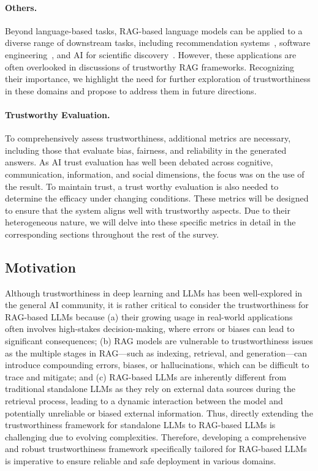 \paragraph{Others.}
Beyond language-based tasks, RAG-based language models can be applied to a diverse range of downstream tasks, including recommendation systems~\cite{li2023gpt4recgenerativeframeworkpersonalized}, software engineering~\cite{fan2023largelanguagemodelssoftware}, and AI for scientific discovery~\cite{ai4science2023impactlargelanguagemodels}. However, these applications are often overlooked in discussions of trustworthy RAG frameworks. Recognizing their importance, we highlight the need for further exploration of trustworthiness in these domains and propose to address them in future directions.

\paragraph{Trustworthy Evaluation.} To comprehensively assess trustworthiness, additional metrics are necessary, including those that evaluate bias, fairness, and reliability in the generated answers. As AI trust evaluation has well been debated across cognitive, communication, information, and social dimensions, the focus was on the use of the result. To maintain trust, a trust worthy evaluation is also needed to determine the efficacy under changing conditions. These metrics will be designed to ensure that the system aligns well with trustworthy aspects. Due to their heterogeneous nature, we will delve into these specific metrics in detail in the corresponding sections throughout the rest of the survey.


\subsection{Motivation}

Although trustworthiness in deep learning and LLMs has been well-explored in the general AI community, it is rather critical to consider the trustworthiness for RAG-based LLMs because (a) their growing usage in real-world applications often involves high-stakes decision-making, where errors or biases can lead to significant consequences; (b) RAG models are vulnerable to trustworthiness issues as the multiple stages in RAG—such as indexing, retrieval, and generation—can introduce compounding errors, biases, or hallucinations, which can be difficult to trace and mitigate; and (c) RAG-based LLMs are inherently different from traditional standalone LLMs as they rely on external data sources during the retrieval process, leading to a dynamic interaction between the model and potentially unreliable or biased external information. Thus, directly extending the trustworthiness framework for standalone LLMs to RAG-based LLMs is challenging due to evolving complexities. Therefore, developing a comprehensive and robust trustworthiness framework specifically tailored for RAG-based LLMs is imperative to ensure reliable and safe deployment in various domains. 


